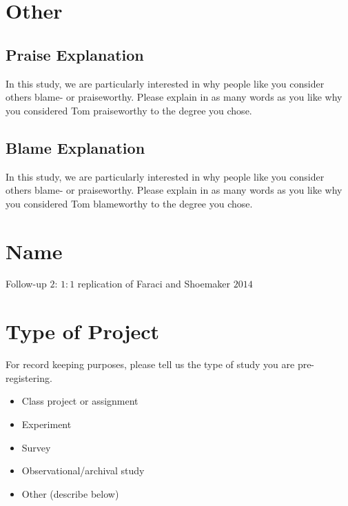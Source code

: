 \documentclass[scrarticle]{scrartcl}
\begin{document}
\section{Other}


\subsection*{Praise Explanation}
In this study, we are particularly interested in why people like you consider others blame- or praiseworthy.
Please explain in as many words as you like why you considered Tom praiseworthy to the degree you chose.


\subsection*{Blame Explanation}
In this study, we are particularly interested in why people like you consider others blame- or praiseworthy.
Please explain in as many words as you like why you considered Tom blameworthy to the degree you chose.


\section{Name}
Follow-up $2$: $1:1$ replication of Faraci and Shoemaker $2014$


\section{Type of Project}
For record keeping purposes, please tell us the type of study you are pre-registering.

\begin{itemize}[label=\Square,noitemsep]
   \item Class project or assignment
   \item[\XBox] Experiment
   \item Survey
   \item Observational/archival study
   \item Other (describe below)
\end{itemize}
\end{document}

